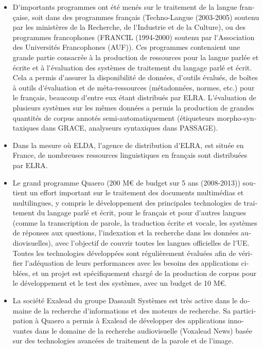 \begin{french}
\begin{multicols}{2}
\begin{itemize}
\item D{\mbox '}importants programmes ont été menés sur le traitement
  de la langue française, soit dans des programmes français
  (Techno-Langue (2003-2005) soutenu par les ministères de la
  Recherche, de l{\mbox '}Industrie et de la Culture), ou des
  programmes francophones (FRANCIL (1994-2000) soutenu par l{\mbox
    '}Association des Universités Francophones (AUF)). Ces programmes
  contenaient une grande partie consacrée à la production de
  ressources pour la langue parlée et écrite et à l{\mbox '}évaluation
  des systèmes de traitement du langage parlé et écrit. Cela a permis
  d{\mbox '}assurer la disponibilité de données, d{\mbox '}outils
  évalués, de boîtes à outils d{\mbox '}évaluation et de
  méta-ressources (métadonnées, normes, etc.) pour le français,
  beaucoup d{\mbox '}entre eux étant distribués par ELRA. L{\mbox
    '}évaluation de plusieurs systèmes sur les mêmes données a permis
  la production de grandes quantités de corpus annotés
  semi-automatiquement (étiqueteurs morpho-syntaxiques dans GRACE,
  analyseurs syntaxiques dans PASSAGE).

\item Dans la mesure où ELDA, l{\mbox '}agence de distribution d{\mbox '}ELRA, est située en
France, de nombreuses ressources linguistiques en français sont
distribuées par ELRA.

\item Le grand programme Quaero (200 M€ de budget sur 5 ans (2008-2013))
soutient un effort important sur le traitement des documents
multimédias et multilingues, y compris le développement des
principales technologies de traitement du langage parlé et écrit, pour
le français et pour d{\mbox '}autres langues (comme la transcription de
parole, la traduction écrite et vocale, les systèmes de réponses aux
questions, l{\mbox '}indexation et la recherche dans les données
audiovisuelles), avec l{\mbox '}objectif de couvrir toutes les langues
officielles de l{\mbox '}UE. Toutes les technologies développées sont
régulièrement évaluées afin de vérifier l{\mbox '}adéquation de leurs
performances avec les besoins des applications ciblées, et un projet
est spécifiquement chargé de la production de corpus pour le
développement et le test des systèmes, avec un budget de 10 M€.

\item La société Exalead du groupe Dassault Systèmes est très active dans le
domaine de la recherche d{\mbox '}informations et des moteurs de recherche. Sa
participation à Quaero a permis à Exalead de développer des
applications innovantes dans le domaine de la recherche audiovisuelle
(Voxalead News) basée sur des technologies avancées de traitement de
la parole et de l{\mbox '}image.


\end{itemize}
\end{multicols}
\end{french}
